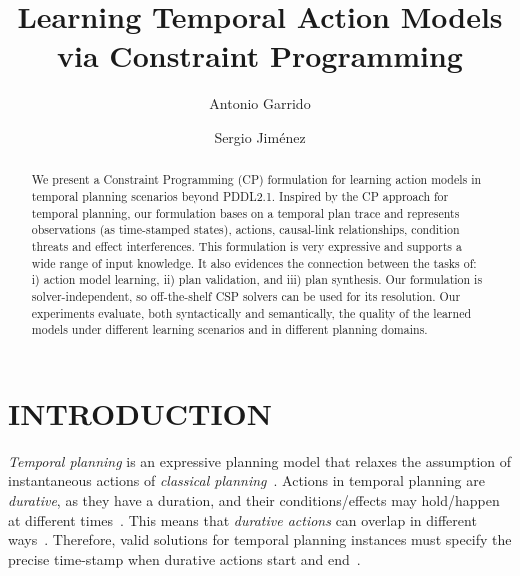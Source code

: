 \documentclass{ecai}
\begin{document}
\title{Learning Temporal Action Models via Constraint Programming}
\author{Antonio Garrido \and Sergio Jim\'enez }
 
 
\maketitle

\begin{abstract}
  We present a Constraint Programming (CP) formulation for learning action models in temporal planning scenarios beyond PDDL2.1.
  Inspired by the CP approach for temporal planning, our formulation bases on a temporal plan trace and represents observations (as time-stamped states), actions, causal-link relationships, condition threats and effect interferences. This formulation is very expressive and supports a wide range of input knowledge. It also evidences the connection between the tasks of: i) action model learning, ii) plan validation, and iii) plan synthesis. Our formulation is solver-independent, so off-the-shelf CSP solvers can be used for its resolution. Our experiments evaluate, both syntactically and semantically, the quality of the learned models under different learning scenarios and in different planning domains. 
\end{abstract}


\section{INTRODUCTION}

{\em Temporal planning} is an expressive planning model that relaxes the assumption of instantaneous actions of {\em classical planning}~\cite{geffner2013concise}. Actions in temporal planning are {\em durative}, as they have a duration, and their conditions/effects may hold/happen at different times~\cite{fox2003pddl2}. This means that {\em durative actions} can 
overlap in different ways~\cite{cushing2007temporal}. Therefore, valid solutions for temporal planning instances must specify the precise time-stamp when durative actions start and end~\cite{howey2004val}.
\end{document}
